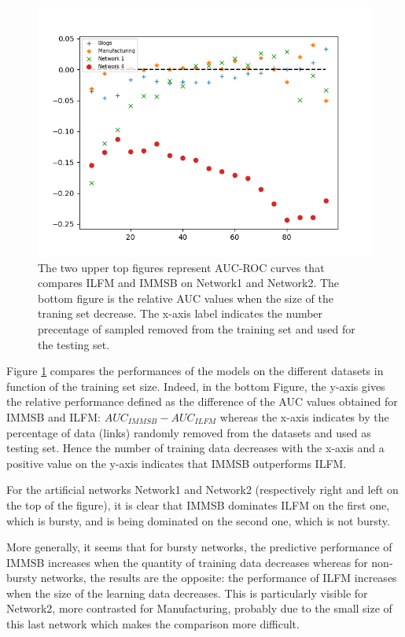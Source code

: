 \begin{figure}[h]
\begin{minipage}{0.4\textwidth}
            \includegraphics[width=\textwidth]{img/corpus/testset_max_20_roc_evolution.png}
        \end{minipage}
        \caption{The two upper top figures represent AUC-ROC curves that compares ILFM and IMMSB on Network1 and Network2. The bottom figure is the relative AUC values when the size of the traning set decrease. The x-axis label indicates the number precentage of sampled removed from the training set and used for the testing set. } 
	\label{fig:auc}
\end{figure}


Figure \ref{fig:auc} compares the performances of the models on the different datasets in function of  the training set size. Indeed, in the bottom Figure, the y-axis gives the relative performance defined as the difference of the AUC values obtained for IMMSB and ILFM: $AUC_{IMMSB} - AUC_{ILFM}$ whereas the x-axis indicates by the percentage of data (links) randomly removed from the datasets and  used as  testing set. Hence the number of training data decreases with the x-axis and a positive value on the y-axis indicates that IMMSB outperforms ILFM. 

For the artificial networks Network1 and Network2 (respectively right and left on the top of the figure), it is clear that IMMSB dominates ILFM on the first one, which is bursty, and is being dominated on the second one, which is not bursty.

More generally, it seems that for bursty networks, the predictive performance of IMMSB increases when the quantity of training data decreases whereas for non-bursty networks, the results are the opposite: the performance of ILFM increases when the size of the learning data decreases. This is particularly visible for Network2, more contrasted for Manufacturing,  probably due to the small size of this last network which makes the comparison more difficult.



